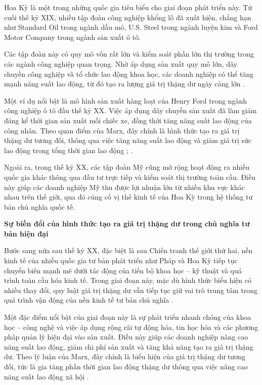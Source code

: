 Hoa Kỳ là một trong những quốc gia tiêu biểu cho giai đoạn phát triển này. Từ cuối thế kỷ XIX, nhiều tập đoàn công nghiệp khổng lồ đã xuất hiện, chẳng hạn như Standard Oil trong ngành dầu mỏ, U.S. Steel trong ngành luyện kim và Ford Motor Company trong ngành sản xuất ô tô.

Các tập đoàn này có quy mô vốn rất lớn và kiểm soát phần lớn thị trường trong các ngành công nghiệp quan trọng. Nhờ áp dụng sản xuất quy mô lớn, dây chuyền công nghiệp và tổ chức lao động khoa học, các doanh nghiệp có thể tăng mạnh năng suất lao động, từ đó tạo ra lượng giá trị thặng dư ngày càng lớn \cite{LeninImperial}.

Một ví dụ nổi bật là mô hình sản xuất hàng loạt của Henry Ford trong ngành công nghiệp ô tô đầu thế kỷ XX. Việc áp dụng dây chuyền sản xuất đã làm giảm đáng kể thời gian sản xuất mỗi chiếc xe, đồng thời tăng năng suất lao động của công nhân. Theo quan điểm của Marx, đây chính là hình thức tạo ra giá trị thặng dư tương đối, thông qua việc tăng năng suất lao động và giảm giá trị sức lao động trong tổng thời gian lao động \cite{gt}; \cite{Capital}.

Ngoài ra, trong thế kỷ XX, các tập đoàn Mỹ cũng mở rộng hoạt động ra nhiều quốc gia khác thông qua đầu tư trực tiếp và kiểm soát thị trường toàn cầu. Điều này giúp các doanh nghiệp Mỹ thu được lợi nhuận lớn từ nhiều khu vực khác nhau trên thế giới, qua đó củng cố vị thế kinh tế của Hoa Kỳ trong hệ thống tư bản chủ nghĩa quốc tế.

\textbf{Sự biến đổi của hình thức tạo ra giá trị thặng dư trong chủ nghĩa tư bản hiện đại}

Bước sang nửa sau thế kỷ XX, đặc biệt là sau Chiến tranh thế giới thứ hai, nền kinh tế của nhiều quốc gia tư bản phát triển như Pháp và Hoa Kỳ tiếp tục chuyển biến mạnh mẽ dưới tác động của tiến bộ khoa học – kỹ thuật và quá trình toàn cầu hóa kinh tế. Trong giai đoạn này, mặc dù hình thức biểu hiện có nhiều thay đổi, quy luật giá trị thặng dư vẫn tiếp tục giữ vai trò trung tâm trong quá trình vận động của nền kinh tế tư bản chủ nghĩa \cite{gt}.

Một đặc điểm nổi bật của giai đoạn này là sự phát triển nhanh chóng của khoa học – công nghệ và việc áp dụng rộng rãi tự động hóa, tin học hóa và các phương pháp quản lý hiện đại vào sản xuất. Điều này giúp các doanh nghiệp nâng cao năng suất lao động, giảm chi phí sản xuất và tăng khả năng tạo ra giá trị thặng dư. Theo lý luận của Marx, đây chính là biểu hiện của giá trị thặng dư tương đối, tức là gia tăng phần thời gian lao động thặng dư thông qua việc nâng cao năng suất lao động xã hội \cite{Capital}.

